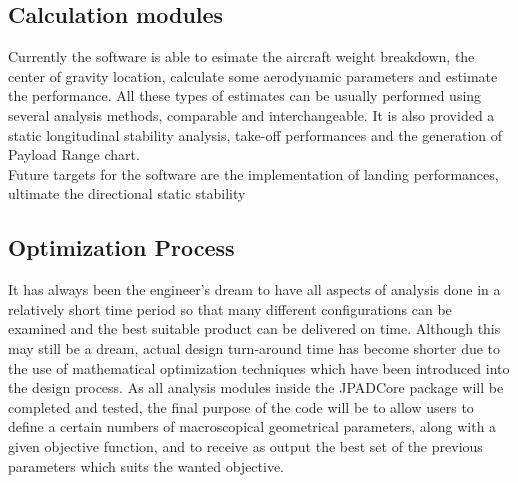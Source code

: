 \subsection{Calculation modules}
Currently the software is able to esimate the aircraft weight breakdown, the center of gravity location, calculate some aerodynamic parameters and estimate the performance. All these types of estimates can be usually performed using several analysis methods, comparable and interchangeable. 
It is also provided a static longitudinal stability analysis, take-off performances and the generation of Payload Range chart.\\
Future targets for the software are the implementation of landing performances, ultimate the directional static stability %


\subsection{Optimization Process}
It has always been the engineer’s dream to have all aspects of analysis done in a relatively short time period so that many different configurations can be examined and the best suitable product can be delivered on time. Although this may still be a dream, actual design turn-around time has become shorter due to the use of mathematical optimization techniques which have been
introduced into the design process.\cite{torenbeek2013advanced}
As all analysis modules inside the JPADCore package will be completed and tested, the final purpose of the code will be to allow users to define a certain numbers of macroscopical geometrical parameters, along with a given objective function, and to receive as output the best set of the previous parameters which suits the wanted objective.
